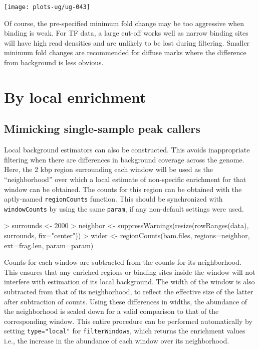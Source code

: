 \documentclass[12pt]{report}
\renewenvironment{Schunk}{\vspace{0pt}}{\vspace{0pt}}
\newcommand{\code}[1]{{\small\texttt{#1}}}
\begin{document}
\begin{center}
\texttt{[image: plots-ug/ug-043]}
\end{center}

Of course, the pre-specified minimum fold change may be too aggressive when binding is weak. 
For TF data, a large cut-off works well as narrow binding sites will have high read densities and are unlikely to be lost during filtering. 
Smaller minimum fold changes are recommended for diffuse marks where the difference from background is less obvious. 

\section{By local enrichment}

\subsection{Mimicking single-sample peak callers}
Local background estimators can also be constructed.
This avoids inappropriate filtering when there are differences in background coverage across the genome. 
Here, the 2 kbp region surrounding each window will be used as the ``neighborhood'' over which a local estimate of non-specific enrichment for that window can be obtained. 
The counts for this region can be obtained with the aptly-named \code{regionCounts} function.
This should be synchronized with \code{windowCounts} by using the same \code{param}, if any non-default settings were used.

\begin{Schunk}
\begin{Sinput}
> surrounds <- 2000
> neighbor <- suppressWarnings(resize(rowRanges(data), surrounds, fix="center"))
> wider <- regionCounts(bam.files, regions=neighbor, ext=frag.len, param=param)
\end{Sinput}
\end{Schunk}

Counts for each window are subtracted from the counts for its neighborhood.
This ensures that any enriched regions or binding sites inside the window will not interfere with estimation of its local background.
The width of the window is also subtracted from that of its neighborhood, to reflect the effective size of the latter after subtraction of counts.
Using these differences in widths, the abundance of the neighborhood is scaled down for a valid comparison to that of the corresponding window.
This entire procedure can be performed automatically by setting \code{type="local"} for \code{filterWindows}, which returns the enrichment values i.e., the increase in the abundance of each window over its neighborhood.
\end{document}
